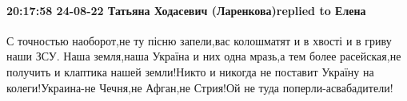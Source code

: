 \paragraph{20:17:58 24-08-22 Татьяна Ходасевич (Ларенкова)replied to Елена}

С точностью наоборот,не ту пісню запели,вас колошматят и в хвості и в гриву
наши ЗСУ. Наша земля,наша Україна и них одна мразь,а тем более расейская,не
получить и клаптика нашей земли!Никто и никогда не поставит Україну на
колеги!Украина-не Чечня,не Афган,не Стрия!Ой не туда поперли-асвабадители!
